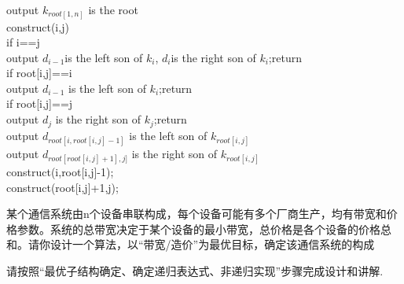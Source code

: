 \documentclass[a4paper, justified]{tufte-handout}
\begin{document}
\begin{solution}
output $k_{root[1,n]}$ is the root\\
construct(i,j)\\
\hspace*{0.6 cm} if i==j\\
\hspace*{1.2 cm}    output $d_{i-1}$is the left son of $k_i$, $d_i$is the right son of $k_i$;return\\
\hspace*{0.6 cm} if root[i,j]==i\\
\hspace*{1.2 cm}    output $d_{i-1}$ is the left son of $k_i$;return\\
\hspace*{0.6 cm} if root[i,j]==j\\
\hspace*{1.2 cm}    output $d_j$ is the right son of $k_j$;return\\
\hspace*{0.6 cm} output $d_{root[i,root[i,j]-1]}$ is the left son of $k_{root[i,j]}$\\
\hspace*{0.6 cm} output $d_{root[root[i,j]+1],j]}$ is the right son of $k_{root[i,j]}$\\
\hspace*{0.6 cm} construct(i,root[i,j]-1);\\
\hspace*{0.6 cm} construct(root[i,j]+1,j);\\

\end{solution}

\beginoptional

\begin{problem}
\end{problem}

\begin{solution}
\end{solution}

\beginot
\begin{ot}[通信系统]
	某个通信系统由n个设备串联构成，每个设备可能有多个厂商生产，均有带宽和价格参数。系统的总带宽决定于某个设备的最小带宽，总价格是各个设备的价格总和。请你设计一个算法，以``带宽/造价''为最优目标，确定该通信系统的构成
	
	请按照``最优子结构确定、确定递归表达式、非递归实现''步骤完成设计和讲解.	
\end{ot}
\end{document}
